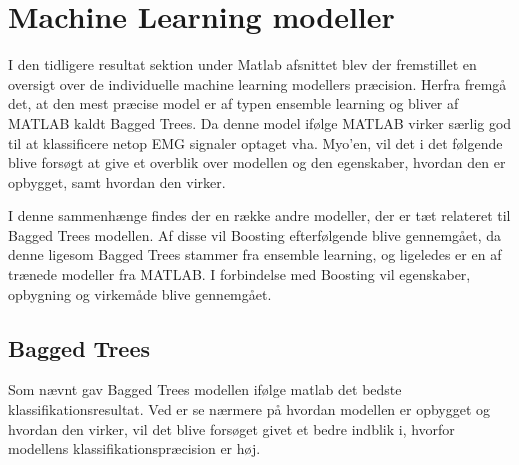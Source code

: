 \thispagestyle{fancy}
\chapter{Machine Learning modeller}
\label{chp:mlm}
I den tidligere resultat sektion under Matlab afsnittet blev der fremstillet en oversigt over de individuelle machine learning modellers præcision. Herfra fremgå det, at den mest præcise model er af typen ensemble learning og bliver af MATLAB kaldt Bagged Trees. Da denne model ifølge MATLAB virker særlig god til at klassificere netop EMG signaler optaget vha. Myo'en, vil det i det følgende blive forsøgt at give et overblik over modellen og den egenskaber, hvordan den er opbygget, samt hvordan den virker. 

I denne sammenhænge findes der en række andre modeller, der er tæt relateret til Bagged Trees modellen. Af disse vil Boosting efterfølgende blive gennemgået, da denne ligesom Bagged Trees stammer fra ensemble learning, og ligeledes er en af trænede modeller fra MATLAB. I forbindelse med Boosting vil egenskaber, opbygning og virkemåde blive gennemgået.

\section{Bagged Trees}
Som nævnt gav Bagged Trees modellen ifølge matlab det bedste klassifikationsresultat.  Ved er se nærmere på hvordan modellen er opbygget og hvordan den virker, vil det blive forsøget  givet et bedre indblik i, hvorfor modellens klassifikationspræcision er høj. 

